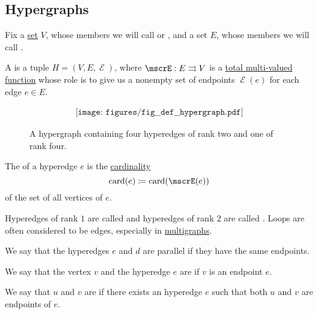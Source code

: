 \subsection{Hypergraphs}\label{subsec:hypergraphs}

\begin{definition}\label{def:hypergraph}
  Fix a \hyperref[def:set]{set} \( V \), whose members we will call  or , and a set \( E \), whose members we will call .

  A  is a tuple \( H = (V, E, \mscrE) \), where \( \mscrE: E \multto V \) is a \hyperref[def:multi_valued_function/total]{total multi-valued function} whose role is to give us a nonempty set of endpoints \( \mscrE(e) \) for each edge \( e \in E \).

  \begin{figure}[h]
    \begin{equation*}
      \begin{aligned}
        \texttt{[image: figures/fig\_\_def\_\_hypergraph.pdf]}
      \end{aligned}
    \end{equation*}
    \caption{A hypergraph containing four hyperedges of rank two and one of rank four.}\label{fig:def:hypergraph}
  \end{figure}

  \begin{thmenum}
     The  of a hyperedge \( e \) is the \hyperref[thm:cardinality_existence]{cardinality}
    \begin{equation*}
      \card(e) \coloneqq \card(\mscrE(e))
    \end{equation*}
    of the set of all vertices of \( e \).

    Hyperedges of rank \( 1 \) are called  and hyperedges of rank \( 2 \) are called . Loops are often considered to be edges, especially in \hyperref[def:undirected_multigraph]{multigraphs}.

     We say that the hyperedges \( e \) and \( d \) are parallel if they have the same endpoints.

     We say that the vertex \( v \) and the hyperedge \( e \) are  if \( v \) is an endpoint \( e \).

     We say that \( u \) and \( v \) are  if there exists an hyperedge \( e \) such that both \( u \) and \( v \) are endpoints of \( e \).


\end{thmenum}
\end{definition}
